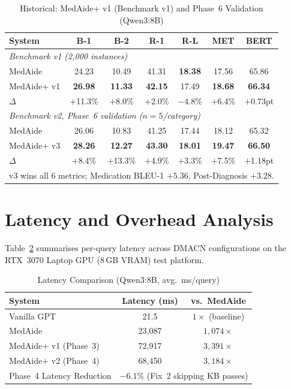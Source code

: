 \documentclass[a4paper,12pt]{article}
\begin{document}
\begin{table}[h]
\centering
\caption{Historical: MedAide+ v1 (Benchmark v1) and Phase~6 Validation (Qwen3:8B)}
\label{tab:v1_historical}
\begin{tabular}{lcccccc}
\toprule
\textbf{System} & \textbf{B-1} & \textbf{B-2} & \textbf{R-1} &
  \textbf{R-L} & \textbf{MET} & \textbf{BERT} \\
\midrule
\multicolumn{7}{l}{\textit{Benchmark v1 (2{,}000 instances)}} \\
MedAide     & 24.23 & 10.49 & 41.31 & \textbf{18.38} & 17.56 & 65.86 \\
MedAide+ v1 & \textbf{26.98} & \textbf{11.33} & \textbf{42.15} & 17.49 & \textbf{18.68} & \textbf{66.34} \\
$\Delta$ & $+$11.3\% & $+$8.0\% & $+$2.0\% & $-$4.8\% & $+$6.4\% & $+$0.73pt \\
\midrule
\multicolumn{7}{l}{\textit{Benchmark v2, Phase~6 validation ($n{=}5$/category)}} \\
MedAide     & 26.06 & 10.83 & 41.25 & 17.44 & 18.12 & 65.32 \\
MedAide+ v3 & \textbf{28.26} & \textbf{12.27} & \textbf{43.30} & \textbf{18.01} & \textbf{19.47} & \textbf{66.50} \\
$\Delta$ & $+$8.4\% & $+$13.3\% & $+$4.9\% & $+$3.3\% & $+$7.5\% & $+$1.18pt \\
\bottomrule
\multicolumn{7}{l}{\scriptsize v3 wins all 6 metrics; Medication BLEU-1 $+5.36$, Post-Diagnosis $+3.28$.} \\
\end{tabular}
\end{table}

\section{Latency and Overhead Analysis}

Table~\ref{tab:latency} summarises per-query latency across DMACN
configurations on the RTX~3070 Laptop GPU (8\,GB VRAM) test platform.

\begin{table}[h]
\centering
\caption{Latency Comparison (Qwen3:8B, avg.\ ms/query)}
\label{tab:latency}
\begin{tabular}{lcc}
\toprule
\textbf{System} & \textbf{Latency (ms)} & \textbf{vs.\ MedAide} \\
\midrule
Vanilla GPT              & 21.5       & $1\times$ (baseline) \\
MedAide                  & 23{,}087   & $1{,}074\times$ \\
MedAide+ v1 (Phase~3)    & 72{,}917   & $3{,}391\times$ \\
MedAide+ v2 (Phase~4)    & 68{,}450   & $3{,}184\times$ \\
\midrule
Phase~4 Latency Reduction & \multicolumn{2}{c}{$-6.1\%$ (Fix~2 skipping KB passes)} \\
\bottomrule
\end{tabular}
\end{table}
\end{document}
